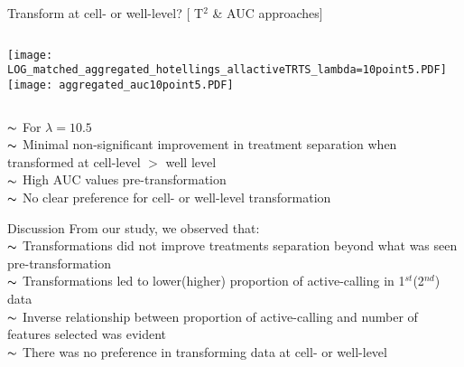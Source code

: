 \documentclass[11pt]{beamer}
\begin{document}
\begin{frame}{Transform at cell- or well-level? [ T$^2$ \& AUC approaches]}
\begin{columns}
\flushleft
\texttt{[image: LOG\_matched\_aggregated\_hotellings\_allactiveTRTS\_lambda=10point5.PDF]}
\flushleft
\texttt{[image: aggregated\_auc10point5.PDF]}
\end{columns}
$\thicksim$ For $\lambda = 10.5$ \\
$\thicksim$ Minimal non-significant improvement in treatment separation when transformed at cell-level $>$ well level\\
$\thicksim$ High AUC values pre-transformation \\
$\thicksim$ No clear preference for cell- or well-level transformation \\
\vspace{1mm}
\end{frame}

\begin{frame}{Discussion}
From our study, we observed that: \\
$\thicksim$ Transformations did not improve treatments separation beyond what was seen pre-transformation \\
$\thicksim$ Transformations led to lower(higher) proportion of active-calling in 1$^{st}$(2$^{nd}$) data \\
$\thicksim$ Inverse relationship between proportion of active-calling and number of features selected was evident\\
$\thicksim$ There was no preference in transforming data at cell- or well-level 
\end{frame}

\end{document}
